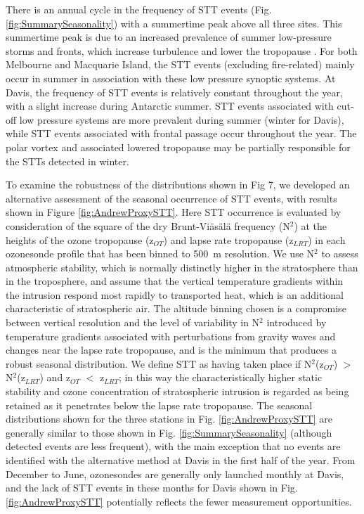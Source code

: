   There is an annual cycle in the frequency of STT events  (Fig. \ref{fig:SummarySeasonality}) with a summertime peak above all three sites.
  This summertime peak is due to an increased prevalence of summer low-pressure storms and fronts, which increase turbulence and lower the tropopause \citep{Reutter2015}.
  For both Melbourne and Macquarie Island, the STT events (excluding fire-related) mainly occur in summer in association with these low pressure synoptic systems.
  At Davis, the frequency of STT events is relatively constant throughout the year, with a slight increase during Antarctic summer.
  STT events associated with cut-off low pressure systems are more prevalent during summer (winter for Davis), while STT events associated with frontal passage occur throughout the year.
  The polar vortex and associated lowered tropopause may be partially responsible for the STTs detected in winter.

  
  To examine the robustness of the distributions shown in Fig 7, we developed an alternative assessment of the seasonal occurrence of STT events, with results shown in Figure \ref{fig:AndrewProxySTT}.
  Here STT occurrence is evaluated by consideration of the square of the dry Brunt-Viäsälä frequency (N$^2$) at the heights of the ozone tropopause (z$_{OT}$) and lapse rate tropopause (z$_{LRT}$) in each ozonesonde profile that has been binned to 500~m resolution.
  We use N$^2$ to assess atmospheric stability, which is normally distinctly higher in the stratosphere than in the troposphere, and assume that the vertical temperature gradients within the intrusion respond most rapidly to transported heat, which is an additional characteristic of stratospheric air.
  The altitude binning chosen is a compromise between vertical resolution and the level of variability in N$^2$ introduced by temperature gradients associated with perturbations from gravity waves and changes near the lapse rate tropopause, and is the minimum that produces a robust seasonal distribution.
  We define STT as having taken place if N$^2$(z$_{OT}$) $>$ N$^2$(z$_{LRT}$) and z$_{OT}$ $<$ z$_{LRT}$; in this way the characteristically higher static stability and ozone concentration of stratospheric intrusion is regarded as being retained as it penetrates below the lapse rate tropopause. 
  The seasonal distributions shown for the three stations in Fig. \ref{fig:AndrewProxySTT} are generally similar to those shown in Fig. \ref{fig:SummarySeasonality} (although detected events are less frequent), with the main exception that no events are identified with the alternative method at Davis in the first half of the year.
  From December to June, ozonesondes are generally only launched monthly at Davis, and the lack of STT events in these months for Davis shown in Fig. \ref{fig:AndrewProxySTT} potentially reflects the fewer measurement opportunities.
  
